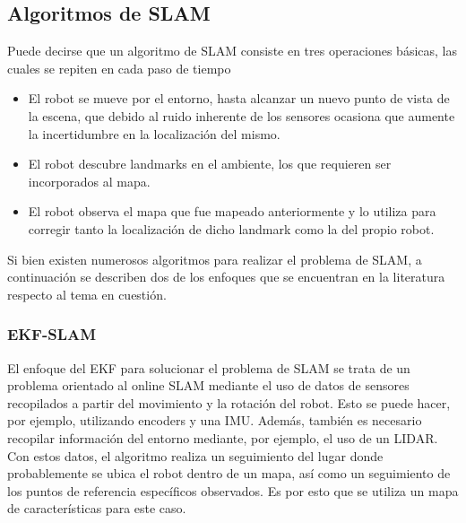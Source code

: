 
\ifimagenes
\else
\subsection{Algoritmos de SLAM}
Puede decirse que un algoritmo de SLAM consiste en tres operaciones básicas, las cuales se repiten en cada paso de tiempo
\begin{itemize}
    \item El robot se mueve por el entorno, hasta alcanzar un nuevo punto de vista de la escena, que debido al ruido inherente de los sensores ocasiona que aumente la incertidumbre en la localización del mismo.
    \item El robot descubre landmarks en el ambiente, los que requieren ser incorporados al mapa.
    \item El robot observa el mapa que fue mapeado anteriormente y lo utiliza para corregir tanto la localización de dicho landmark como la del propio robot.
\end{itemize}

Si bien existen numerosos algoritmos para realizar el problema de SLAM, a continuación se describen dos de los enfoques que se encuentran en la literatura respecto al tema en cuestión.

\subsubsection{EKF-SLAM}
El enfoque del EKF para solucionar el problema de SLAM se trata de un problema orientado al online SLAM mediante el uso de datos de sensores recopilados a partir del movimiento y la rotación del robot. Esto se puede hacer, por ejemplo, utilizando encoders y una IMU. Además, también es necesario recopilar información del entorno mediante, por ejemplo, el uso de un LIDAR. Con estos datos, el algoritmo realiza un seguimiento del lugar donde probablemente se ubica el robot dentro de un mapa, así como un seguimiento de los puntos de referencia específicos observados. Es por esto que se utiliza un mapa de características para este caso.

